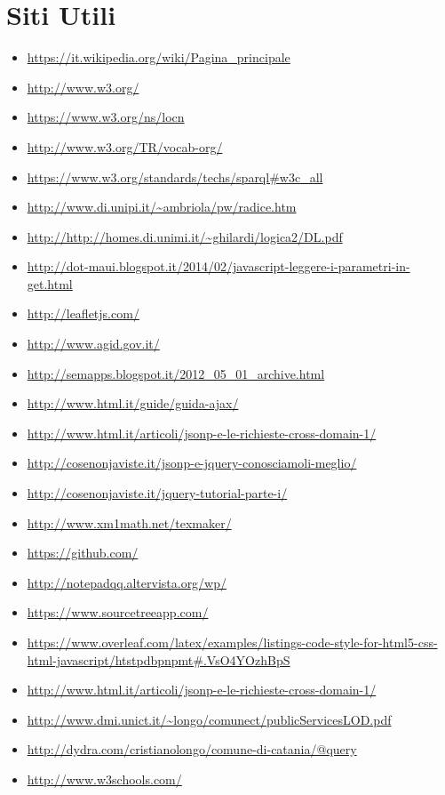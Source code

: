 \documentclass[a4paper,11pt]{article}
\begin{document}
\appendix
\section{Siti Utili}

\begin{itemize}
	\item \url{https://it.wikipedia.org/wiki/Pagina_principale}
	\item \url{http://www.w3.org/}
	\item \url{https://www.w3.org/ns/locn}
	\item \url{http://www.w3.org/TR/vocab-org/}
	\item \url{https://www.w3.org/standards/techs/sparql#w3c_all}
	\item \url{http://www.di.unipi.it/~ambriola/pw/radice.htm}
	\item \url{http://http://homes.di.unimi.it/~ghilardi/logica2/DL.pdf}
	\item \url{http://dot-maui.blogspot.it/2014/02/javascript-leggere-i-parametri-in-get.html}
	\item \url{http://leafletjs.com/}
	\item \url{http://www.agid.gov.it/}
	\item \url{http://semapps.blogspot.it/2012_05_01_archive.html}
	\item \url{http://www.html.it/guide/guida-ajax/}
	\item \url{http://www.html.it/articoli/jsonp-e-le-richieste-cross-domain-1/}
	
	\item \url{http://cosenonjaviste.it/jsonp-e-jquery-conosciamoli-meglio/}
	\item \url{http://cosenonjaviste.it/jquery-tutorial-parte-i/}
	\item \url{http://www.xm1math.net/texmaker/}
	\item \url{https://github.com/}
	\item \url{http://notepadqq.altervista.org/wp/}
	\item \url{https://www.sourcetreeapp.com/}
	\item \url{https://www.overleaf.com/latex/examples/listings-code-style-for-html5-css-html-javascript/htstpdbpnpmt#.VsO4YOzhBpS}
	\item \url{http://www.html.it/articoli/jsonp-e-le-richieste-cross-domain-1/}
	\item \url{http://www.dmi.unict.it/~longo/comunect/publicServicesLOD.pdf}
	\item {\url{http://dydra.com/cristianolongo/comune-di-catania/@query}}
	\item \url{http://www.w3schools.com/}

\end{itemize}
\end{document}
